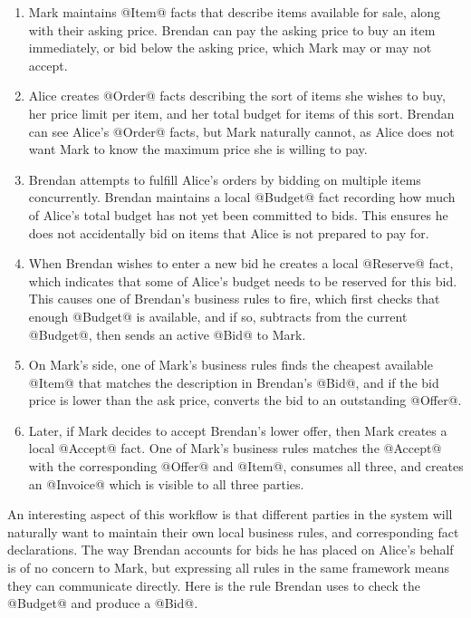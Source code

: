 \begin{enumerate}
\item Mark maintains @Item@ facts that describe items available for sale, along with their asking price. Brendan can pay the asking price to buy an item immediately, or bid below the asking price, which Mark may or may not accept.

\item Alice creates @Order@ facts describing the sort of items she wishes to buy, her price limit per item, and her total budget for items of this sort. Brendan can see Alice's @Order@ facts, but Mark naturally cannot, as Alice does not want Mark to know the maximum price she is willing to pay.

\item Brendan attempts to fulfill Alice's orders by bidding on multiple items concurrently. Brendan maintains a local @Budget@ fact recording how much of Alice's total budget has not yet been committed to bids. This ensures he does not accidentally bid on items that Alice is not prepared to pay for.

\item When Brendan wishes to enter a new bid he creates a local @Reserve@ fact, which indicates that some of Alice's budget needs to be reserved for this bid. This causes one of Brendan's business rules to fire, which first checks that enough @Budget@ is available, and if so, subtracts from the current @Budget@, then sends an active @Bid@ to Mark.

\item On Mark's side, one of Mark's business rules finds the cheapest available @Item@ that matches the description in Brendan's @Bid@, and if the bid price is lower than the ask price, converts the bid to an outstanding @Offer@.

\item Later, if Mark decides to accept Brendan's lower offer, then Mark creates a local @Accept@ fact. One of Mark's business rules matches the @Accept@ with the corresponding @Offer@ and @Item@, consumes all three, and creates an @Invoice@ which is visible to all three parties.
\end{enumerate}

An interesting aspect of this workflow is that different parties in the system will naturally want to maintain their own local business rules, and corresponding fact declarations. The way Brendan accounts for bids he has placed on Alice's behalf is of no concern to Mark, but expressing all rules in the same framework means they can communicate directly. Here is the rule Brendan uses to check the @Budget@ and produce a @Bid@.

